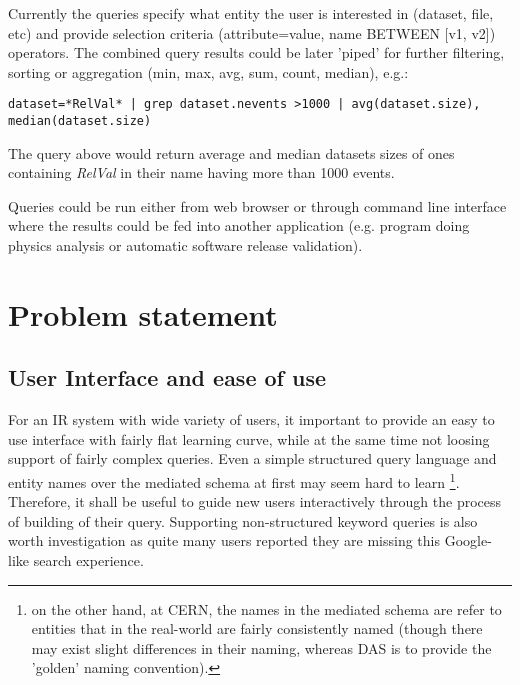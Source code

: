 \documentclass[a4paper,11pt,draft]{article}
\begin{document}
Currently the queries specify what entity the user is interested in (dataset, file, etc) and provide selection criteria (attribute=value, name BETWEEN [v1, v2]) operators. The combined query results could be later 'piped' for further filtering, sorting or aggregation (min, max, avg, sum, count, median), e.g.:

{\small 
\begin{verbatim}
dataset=*RelVal* | grep dataset.nevents >1000 | avg(dataset.size), median(dataset.size)
\end{verbatim}
}

The query above would return average and median datasets sizes  of ones containing  \textit{RelVal} in their name having more than 1000 events.

Queries could be run either from web browser or through  command line interface where the results could  be fed into another application (e.g. program doing physics analysis or automatic software release validation).



\section{Problem statement}
\subsection{User Interface and ease of use}

For an IR system with wide variety of users, it important to provide an easy to use interface with fairly flat learning curve, while at the same time not loosing support of fairly complex queries.
%
	Even a simple structured query language and entity names over the mediated schema  at first may seem hard to learn%
	\footnote{on the other hand, at CERN, the names in the mediated schema are refer to entities that in the real-world are fairly consistently named (though there may exist slight differences in their naming, whereas DAS is to provide the 'golden' naming convention).}. Therefore, it shall be useful to guide new users interactively through the process of building of their query.
%   
   Supporting non-structured keyword queries is also worth investigation as quite many users reported they are missing this Google-like search experience.
        
\end{document}
